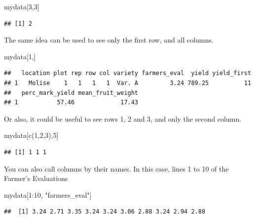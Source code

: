 \documentclass[
]{book}
\newenvironment{Shaded}{\begin{snugshade}}{\end{snugshade}}
\newcommand{\DecValTok}[1]{\textcolor[rgb]{0.00,0.00,0.81}{#1}}
\newcommand{\FunctionTok}[1]{\textcolor[rgb]{0.00,0.00,0.00}{#1}}
\newcommand{\NormalTok}[1]{#1}
\newcommand{\SpecialCharTok}[1]{\textcolor[rgb]{0.00,0.00,0.00}{#1}}
\newcommand{\StringTok}[1]{\textcolor[rgb]{0.31,0.60,0.02}{#1}}
\begin{document}
\begin{Shaded}
\begin{Highlighting}[]
\NormalTok{mydata[}\DecValTok{3}\NormalTok{,}\DecValTok{3}\NormalTok{]}
\end{Highlighting}
\end{Shaded}

\begin{verbatim}
## [1] 2
\end{verbatim}

The same idea can be used to see only the first row, and all columns.

\begin{Shaded}
\begin{Highlighting}[]
\NormalTok{mydata[}\DecValTok{1}\NormalTok{,]}
\end{Highlighting}
\end{Shaded}

\begin{verbatim}
##   location plot rep row col variety farmers_eval  yield yield_first
## 1   Molise    1   1   1   1  Var. A         3.24 789.25          11
##   perc_mark_yield mean_fruit_weight
## 1           57.46             17.43
\end{verbatim}

Or also, it could be useful to see rows 1, 2 and 3, and only the second column.

\begin{Shaded}
\begin{Highlighting}[]
\NormalTok{mydata[}\FunctionTok{c}\NormalTok{(}\DecValTok{1}\NormalTok{,}\DecValTok{2}\NormalTok{,}\DecValTok{3}\NormalTok{),}\DecValTok{5}\NormalTok{]}
\end{Highlighting}
\end{Shaded}

\begin{verbatim}
## [1] 1 1 1
\end{verbatim}

You can also call columns by their names. In this case, lines 1 to 10 of the Farmer's Evaluations

\begin{Shaded}
\begin{Highlighting}[]
\NormalTok{mydata[}\DecValTok{1}\SpecialCharTok{:}\DecValTok{10}\NormalTok{, }\StringTok{"farmers\_eval"}\NormalTok{]}
\end{Highlighting}
\end{Shaded}

\begin{verbatim}
##  [1] 3.24 2.71 3.35 3.24 3.24 3.06 2.88 3.24 2.94 2.88
\end{verbatim}
\end{document}
